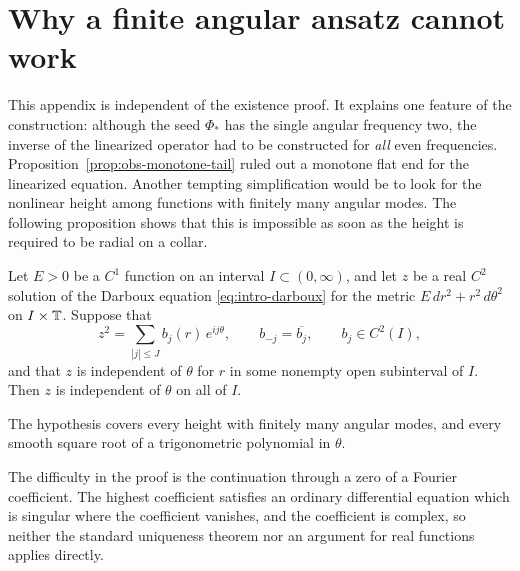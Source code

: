 \section{Why a finite angular ansatz cannot work}
\label{app:app-obstructions}

This appendix is independent of the existence proof. It explains one
feature of the construction: although the seed $\Phi_*$ has the single
angular frequency two, the inverse of the linearized operator had to
be constructed for \emph{all} even frequencies.
Proposition~\ref{prop:obs-monotone-tail} ruled out a monotone flat end
for the linearized equation. Another tempting simplification would be
to look for the nonlinear height among functions with finitely many
angular modes. The following proposition shows that this is
impossible as soon as the height is required to be radial on a
collar.

\begin{proposition}\label{prop:obs-finite-square}
Let $E>0$ be a $C^1$ function on an interval $I\subset(0,\infty)$,
and let $z$ be a real $C^2$ solution of the Darboux equation
\eqref{eq:intro-darboux} for the metric $E\,dr^2+r^2\,d\theta^2$ on
$I\times\mathbb T$. Suppose that
\[
 z^2=\sum_{|j|\le J}b_j(r)\,e^{ij\theta},\qquad
 b_{-j}=\overline{b_j},\qquad b_j\in C^2(I),
\]
and that $z$ is independent of $\theta$ for $r$ in some nonempty open
subinterval of $I$. Then $z$ is independent of $\theta$ on all of
$I$.
\end{proposition}

The hypothesis covers every height with finitely many angular modes,
and every smooth square root of a trigonometric polynomial in
$\theta$.

The difficulty in the proof is the continuation through a zero of a
Fourier coefficient. The highest coefficient satisfies an ordinary
differential equation which is singular where the coefficient
vanishes, and the coefficient is complex, so neither the standard
uniqueness theorem nor an argument for real functions applies
directly.

